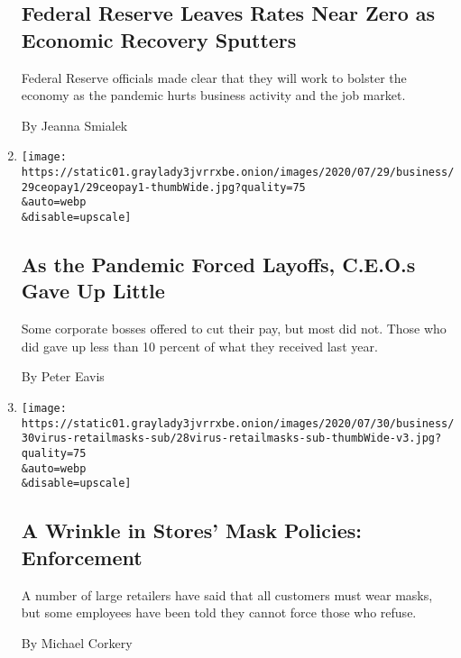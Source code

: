\begin{enumerate}
  \hypertarget{federal-reserve-leaves-rates-near-zero-as-economic-recovery-sputters}{%
  \subsection{Federal Reserve Leaves Rates Near Zero as Economic
  Recovery
  Sputters}\label{federal-reserve-leaves-rates-near-zero-as-economic-recovery-sputters}}

  Federal Reserve officials made clear that they will work to bolster
  the economy as the pandemic hurts business activity and the job
  market.

  By Jeanna Smialek
\item
  \href{/2020/07/29/business/economy/ceo-pay-pandemic-layoffs.html}{}

  \texttt{[image: https://static01.graylady3jvrrxbe.onion/images/2020/07/29/business/29ceopay1/29ceopay1-thumbWide.jpg?quality=75\\\&auto=webp\\\&disable=upscale]}

  \hypertarget{as-the-pandemic-forced-layoffs-ceos-gave-up-little}{%
  \subsection{As the Pandemic Forced Layoffs, C.E.O.s Gave Up
  Little}\label{as-the-pandemic-forced-layoffs-ceos-gave-up-little}}

  Some corporate bosses offered to cut their pay, but most did not.
  Those who did gave up less than 10 percent of what they received last
  year.

  By Peter Eavis
\item
  \href{/2020/07/29/business/coronavirus-masks-stores-walmart.html}{}

  \texttt{[image: https://static01.graylady3jvrrxbe.onion/images/2020/07/30/business/30virus-retailmasks-sub/28virus-retailmasks-sub-thumbWide-v3.jpg?quality=75\\\&auto=webp\\\&disable=upscale]}

  \hypertarget{a-wrinkle-in-stores-mask-policies-enforcement}{%
  \subsection{A Wrinkle in Stores' Mask Policies:
  Enforcement}\label{a-wrinkle-in-stores-mask-policies-enforcement}}

  A number of large retailers have said that all customers must wear
  masks, but some employees have been told they cannot force those who
  refuse.

  By Michael Corkery
\end{enumerate}

